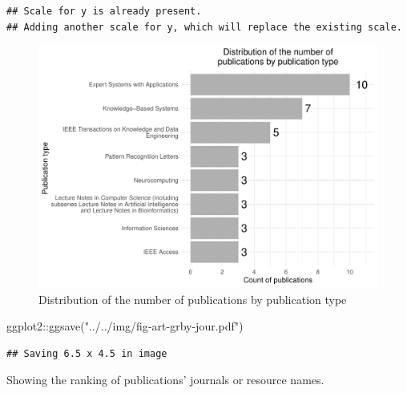 \documentclass[
]{article}
\newenvironment{Shaded}{\begin{snugshade}}{\end{snugshade}}
\newcommand{\AttributeTok}[1]{\textcolor[rgb]{0.77,0.63,0.00}{#1}}
\newcommand{\FunctionTok}[1]{\textcolor[rgb]{0.00,0.00,0.00}{#1}}
\newcommand{\NormalTok}[1]{#1}
\newcommand{\OtherTok}[1]{\textcolor[rgb]{0.56,0.35,0.01}{#1}}
\newcommand{\SpecialCharTok}[1]{\textcolor[rgb]{0.00,0.00,0.00}{#1}}
\newcommand{\StringTok}[1]{\textcolor[rgb]{0.31,0.60,0.02}{#1}}
\begin{document}
\begin{verbatim}
## Scale for y is already present.
## Adding another scale for y, which will replace the existing scale.
\end{verbatim}

\begin{figure}

{\centering \includegraphics{../../img/fig-art-grby-jour} 

}

\caption{Distribution of the number of publications by publication type}\label{fig:bibliochecking8}
\end{figure}

\begin{Shaded}
\begin{Highlighting}[]
\NormalTok{ggplot2}\SpecialCharTok{::}\FunctionTok{ggsave}\NormalTok{(}\StringTok{"../../img/fig{-}art{-}grby{-}jour.pdf"}\NormalTok{)}
\end{Highlighting}
\end{Shaded}

\begin{verbatim}
## Saving 6.5 x 4.5 in image
\end{verbatim}

Showing the ranking of publications' journals or resource names.

\begin{Shaded}
\end{Shaded}
\end{document}
